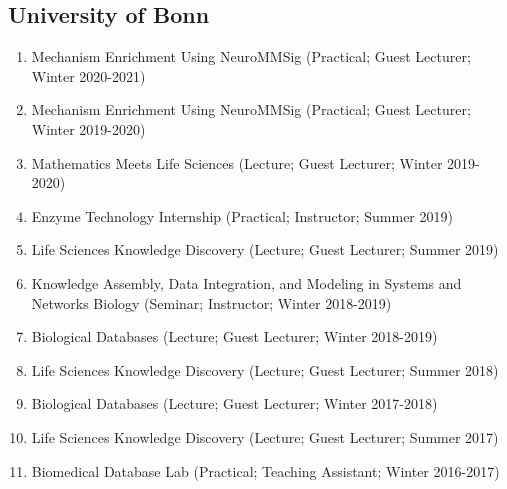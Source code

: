 \documentclass[10pt,a4paper,sans]{moderncv} %
\begin{document}
        \subsection{University of Bonn}
        \begin{enumerate}
        \item     Mechanism Enrichment Using NeuroMMSig (Practical; Guest Lecturer; Winter 2020-2021)

        \item     Mechanism Enrichment Using NeuroMMSig (Practical; Guest Lecturer; Winter 2019-2020)

        \item     Mathematics Meets Life Sciences (Lecture; Guest Lecturer; Winter 2019-2020)

        \item     Enzyme Technology Internship (Practical; Instructor; Summer 2019)

        \item     Life Sciences Knowledge Discovery (Lecture; Guest Lecturer; Summer 2019)

        \item     Knowledge Assembly, Data Integration, and Modeling in Systems and Networks Biology (Seminar; Instructor; Winter 2018-2019)

        \item     Biological Databases (Lecture; Guest Lecturer; Winter 2018-2019)

        \item     Life Sciences Knowledge Discovery (Lecture; Guest Lecturer; Summer 2018)

        \item     Biological Databases (Lecture; Guest Lecturer; Winter 2017-2018)

        \item     Life Sciences Knowledge Discovery (Lecture; Guest Lecturer; Summer 2017)

        \item     Biomedical Database Lab (Practical; Teaching Assistant; Winter 2016-2017)

        \end{enumerate}
\end{document}
